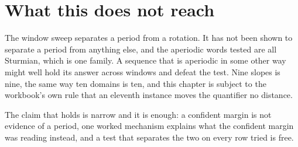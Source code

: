 \section{What this does not reach}

The window sweep separates a period from a rotation. It has not been shown to separate a period from
anything else, and the aperiodic words tested are all Sturmian, which is one family. A sequence that
is aperiodic in some other way might well hold its answer across windows and defeat the test. Nine
slopes is nine, the same way ten domains is ten, and this chapter is subject to the workbook's own
rule that an eleventh instance moves the quantifier no distance.

The claim that holds is narrow and it is enough: a confident margin is not evidence of a period, one
worked mechanism explains what the confident margin was reading instead, and a test that separates
the two on every row tried is free.
